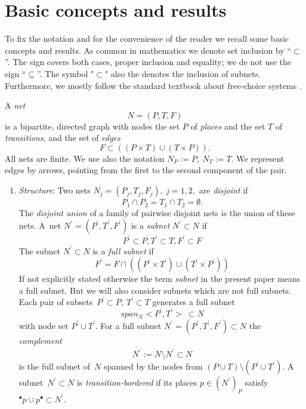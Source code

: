 \documentclass{fundam}
\begin{document}
\section{Basic concepts and results}\label{sect_basicconcepts}

To fix the notation and for the convenience of the reader we recall some basic concepts and results. As common in mathematics we denote set inclusion by ``$\subset$''. The sign covers both cases, proper inclusion and equality; we de not use the sign ``$\subseteq$''. The symbol "$\subset$" also the denotes the inclusion of subnets. Furthermore, we mostly follow the standard textbook about free-choice systems \cite{DE1995}.
\begin{remark}\label{rem_concepts} A \emph{net}
$$N=(P,T,F)$$
is a bipartite, directed graph with nodes the set $P$ of \emph{places} and the set $T$ of \emph{transitions}, and the set of \emph{edges}
$$F \subset \left((P \times{} T) \cup (T \times{} P) \right).$$
All nets are finite. We use also the notation $N_P:=P,\ N_T:=T$. We represent edges by arrows, pointing from the first to the second component of the pair.

\begin{enumerate}
\item \emph{Structure}: Two nets $N_j=(P_j,T_j,F_j),\ j=1,2,$ are \emph{disjoint} if
$$P_1\cap P_2=T_1 \cap T_2 =\emptyset.$$
The \emph{disjoint union} of a family of pairwise disjoint nets is the union of these nets. A~net  \mbox{$N^\prime=(P^\prime, T^\prime, F^\prime)$} is a \emph{subnet} $N^\prime \subset N$ if
$$P^\prime \subset P, T^\prime \subset T, F^\prime \subset F$$
The subnet $N^\prime \subset N$ is a \emph{full subnet} if
$$F^\prime=F \cap \left((P^\prime \times{} T^\prime) \cup (T^\prime \times{} P^\prime) \right)$$
If not explicitly stated otherwise the term \emph{subnet} in the present paper means a full subnet. But we will also consider subnets which are not full subnets. Each pair of
\mbox{subsets $P^\prime \subset P,\ T^\prime \subset T$} generates a full subnet
$$span_N<P^\prime,T^\prime>\ \subset N$$
with node set $P^\prime \cup T^\prime$. For a full subnet $N^\prime=(P^\prime, T^\prime, F^\prime) \subset N$ the \emph{complement}
$$\overline{N^\prime} :=N\setminus N^\prime \subset N$$
is the full subnet \mbox{of $N$} spanned by the nodes from $(P \cup T) \setminus (P^\prime \cup T^\prime)$. A \mbox{subnet $N^\prime \subset N$} is \emph{transition-bordered} if its places $p \in (N^\prime)_P$ satisfy $^\bullet p \cup p ^\bullet \subset N^\prime$.\bigskip


\end{enumerate}
\end{remark}
\end{document}
